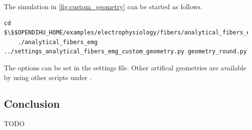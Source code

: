 \begin{reproduce_no_break}
  The simulation in \cref{fig:custom_geometry} can be started as follows.
  \begin{lstlisting}[columns=fullflexible,breaklines=true,postbreak=\mbox{\textcolor{gray}{$\hookrightarrow$}\space}]
    cd $\$$OPENDIHU_HOME/examples/electrophysiology/fibers/analytical_fibers_emg/build_release
    ./analytical_fibers_emg ../settings_analytical_fibers_emg_custom_geometry.py geometry_round.py
  \end{lstlisting}
  The options can be set in the  settings file. Other artifical geometries are available by using other scripts under .
\end{reproduce_no_break}

\subsection{Conclusion}

TODO

